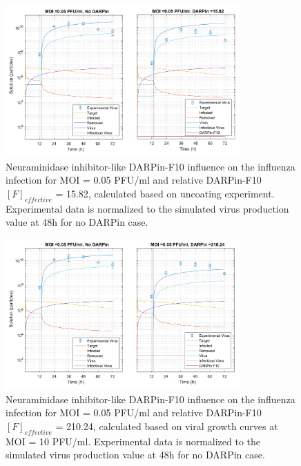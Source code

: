 \begin{figure}
\begin{center}
\includegraphics[width=0.8\textwidth, trim={0cm 0cm 0cm 0cm}, clip]{D_chapters/3_DARPinModels/2_DARPinProduction/comparisonModelTHillIRVViDelayMOI0.072135DARPin15.816AsymmetricDarpinMyosinInhibitor.pdf}
\caption[Neuraminidase inhibitor-like DARPin-F10 for MOI = 0.05 PFU/ml and $F_{effective}$ = 15.82]{Neuraminidase inhibitor-like DARPin-F10 influence on the influenza infection for MOI = 0.05 PFU/ml and relative DARPin-F10 $[F]_{effective}$ = 15.82, calculated based on uncoating experiment. Experimental data is normalized to  the simulated virus production value at 48h for no DARPin case.}
\label{figure:neuraminidaseInhibitorLikeF15}
\end{center}
\end{figure}

\begin{figure}
\begin{center}
\includegraphics[width=0.8\textwidth, trim={0cm 0cm 0cm 0cm}, clip]{D_chapters/3_DARPinModels/2_DARPinProduction/comparisonModelTHillIRVViDelayMOI0.072135DARPin210.236AsymmetricDarpinMyosinInhibitor.pdf}
\caption[Neuraminidase inhibitor-like DARPin-F10 for MOI = 0.05 PFU/ml and $F_{effective}$ = 210.24]{Neuraminidase inhibitor-like DARPin-F10 influence on the influenza infection for MOI = 0.05 PFU/ml and relative DARPin-F10 $[F]_{effective}$ = 210.24, calculated based on viral growth curves at MOI = 10 PFU/ml. Experimental data is normalized to  the simulated virus production value at 48h for no DARPin case.}
\label{figure:neuraminidaseInhibitorLikeF210}
\end{center}
\end{figure}

